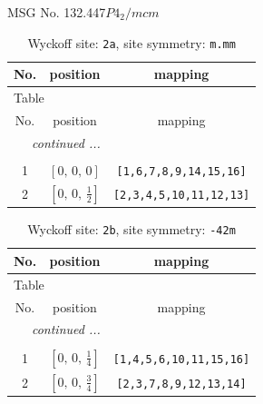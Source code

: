\documentclass[fleqn,8pt]{jsarticle}
\begin{document}
\setcounter{MaxMatrixCols}{32}

\renewcommand{\tablename}{Table~}
\renewcommand{\figurename}{Figure~}
\begin{center}
\LARGE
MSG No. 132.447\quad$P4_{2}/mcm$
\end{center}
\renewcommand{\arraystretch}{1.2}
\begin{longtable}{ccc}
\caption{Wyckoff site: {\tt 2a}, site symmetry: {\tt m.mm}}
 \\
 \hline \hline
No. & position & mapping \\ \hline \endfirsthead

\multicolumn{2}{l}{\tablename\ \thetable{}} \\
 \hline \hline
No. & position & mapping \\ \hline \endhead

 \hline \hline
\multicolumn{2}{r}{\footnotesize\it continued ...} \\ \endfoot

 \hline \hline
\multicolumn{2}{r}{} \\ \endlastfoot

1 & $\left[ 0,\, 0,\, 0 \right]$ & {\tt [1,6,7,8,9,14,15,16]} \\ \hline
2 & $\left[ 0,\, 0,\, \frac{1}{2} \right]$ & {\tt [2,3,4,5,10,11,12,13]} \\
\end{longtable}
\renewcommand{\arraystretch}{1.2}
\begin{longtable}{ccc}
\caption{Wyckoff site: {\tt 2b}, site symmetry: {\tt -42m}}
 \\
 \hline \hline
No. & position & mapping \\ \hline \endfirsthead

\multicolumn{2}{l}{\tablename\ \thetable{}} \\
 \hline \hline
No. & position & mapping \\ \hline \endhead

 \hline \hline
\multicolumn{2}{r}{\footnotesize\it continued ...} \\ \endfoot

 \hline \hline
\multicolumn{2}{r}{} \\ \endlastfoot

1 & $\left[ 0,\, 0,\, \frac{1}{4} \right]$ & {\tt [1,4,5,6,10,11,15,16]} \\ \hline
2 & $\left[ 0,\, 0,\, \frac{3}{4} \right]$ & {\tt [2,3,7,8,9,12,13,14]} \\
\end{longtable}
\end{document}
